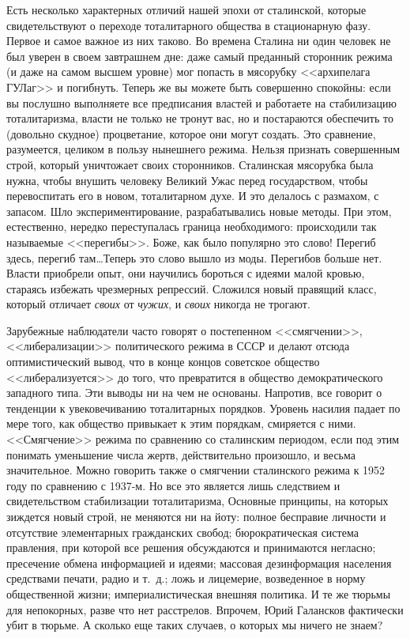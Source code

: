 \documentclass{book}
\begin{document}
Есть несколько характерных отличий нашей эпохи от сталинской, которые свидетельствуют о переходе тоталитарного общества в стационарную фазу. Первое и самое важное из них таково. Во времена Сталина ни один человек не был уверен в своем завтрашнем дне: 
даже самый преданный сторонник режима (и даже на самом высшем уровне) мог попасть в мя­сорубку <<архипелага ГУЛаг>> и погибнуть. 
Теперь же вы мо­жете быть совершенно спокойны: если вы послушно выполня­ете все предписания властей и работаете на стабилизацию 
тота­литаризма, власти не только не тронут вас, но и постараются обеспечить то (довольно скудное) процветание, которое они могут 
создать. Это сравнение, разумеется, целиком в пользу нынешнего режима. Нельзя признать совершенным строй, который уничтожает 
своих сторонников. Сталинская мясорубка была нужна, чтобы внушить человеку Великий Ужас перед государством, чтобы перевоспитать 
его в новом, тоталитарном духе. И это делалось с размахом, с запасом. Шло экспериментирование, разрабатывались новые методы. При 
этом, естественно, нередко переступалась граница необходимого: происходили так называемые <<перегибы>>. Боже, как было популяр­но это слово! Перегиб здесь, перегиб там\ldots Теперь это слово вышло из моды. Перегибов больше нет. Власти приобрели опыт, они научились бороться с идеями малой кровью, стараясь избежать чрезмерных репрессий. Сложился новый правящий класс, который отличает \textit{своих} от \textit{чужих},  и \textit{своих}  никогда не трогают.

Зарубежные наблюдатели часто говорят о постепенном <<смягчении>>, <<либерализации>> политического режима в СССР и делают отсюда 
оптимистический вывод, что в конце концов советское общество <<либерализуется>> до того, что превратится в общество 
демократического западного типа. Эти выводы ни на чем не основаны. Напротив, все говорит о тенденции к увековечиванию 
тоталитарных порядков. Уровень насилия падает по мере того, как общество привыкает к этим порядкам, смиряется с ними. 
<<Смягчение>> режима по сравнению со сталинским периодом, если под этим понимать уменьшение числа жертв, действительно 
произошло, и весьма значительное. Можно говорить также о смягчении сталинского режима к 1952 году по сравнению с 1937-м. Но все 
это является лишь следствием и свидетельством стабилизации тоталитаризма, Основные принципы, на которых зиждется новый строй, не 
меняются ни на йоту: полное бесправие личности и отсутствие элементарных гражданских свобод; бюрократическая систе­ма правления, 
при которой все решения обсуждаются и при­нимаются негласно; пресечение обмена информацией и идея­ми; массовая дезинформация населения средствами печати, радио и т.~д.; ложь и лицемерие, возведенное в норму общест­венной жизни; империалистическая внешняя политика. И те же тюрьмы для непокорных, разве что нет расстрелов. Впрочем, Юрий Галансков фактически убит в тюрьме. А сколько еще таких случаев, о которых мы ничего не знаем?
\end{document}
